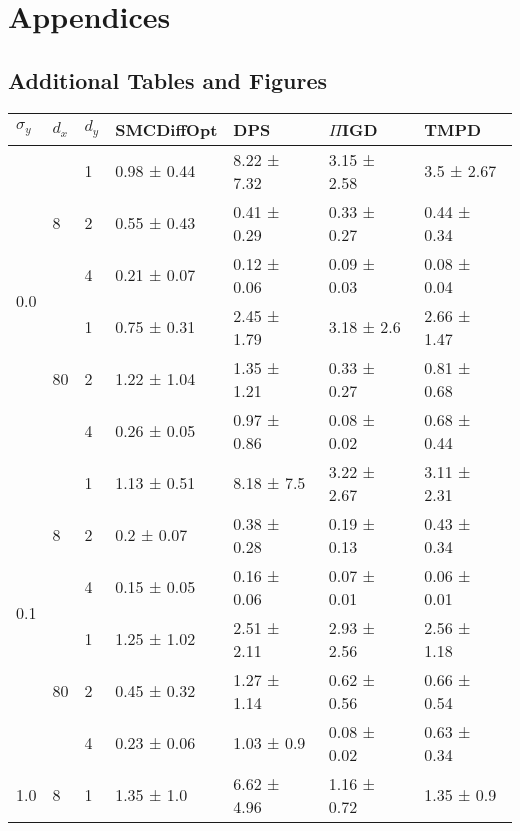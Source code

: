 \chapter*{Appendices}

\section{Additional Tables and Figures}\label{sec:tables}

\begin{table}[ht]
    \centering
    \begin{tabular}{lllllll}
        \toprule
        $\sigma_y$ & $d_x$ & $d_y$ & SMCDiffOpt & DPS & $\Pi$IGD & TMPD \\
        \midrule
        \multirow[t]{6}{*}{0.0} & \multirow[t]{3}{*}{8} & 1 & 0.98 ± 0.44 & 8.22 ± 7.32 & 3.15 ± 2.58 & 3.5 ± 2.67 \\
         &  & 2 & 0.55 ± 0.43 & 0.41 ± 0.29 & 0.33 ± 0.27 & 0.44 ± 0.34 \\
         &  & 4 & 0.21 ± 0.07 & 0.12 ± 0.06 & 0.09 ± 0.03 & 0.08 ± 0.04 \\
        \cline{2-7}
         & \multirow[t]{3}{*}{80} & 1 & 0.75 ± 0.31 & 2.45 ± 1.79 & 3.18 ± 2.6 & 2.66 ± 1.47 \\
         &  & 2 & 1.22 ± 1.04 & 1.35 ± 1.21 & 0.33 ± 0.27 & 0.81 ± 0.68 \\
         &  & 4 & 0.26 ± 0.05 & 0.97 ± 0.86 & 0.08 ± 0.02 & 0.68 ± 0.44 \\
        \cline{1-7} \cline{2-7}
        \multirow[t]{6}{*}{0.1} & \multirow[t]{3}{*}{8} & 1 & 1.13 ± 0.51 & 8.18 ± 7.5 & 3.22 ± 2.67 & 3.11 ± 2.31 \\
         &  & 2 & 0.2 ± 0.07 & 0.38 ± 0.28 & 0.19 ± 0.13 & 0.43 ± 0.34 \\
         &  & 4 & 0.15 ± 0.05 & 0.16 ± 0.06 & 0.07 ± 0.01 & 0.06 ± 0.01 \\
        \cline{2-7}
         & \multirow[t]{3}{*}{80} & 1 & 1.25 ± 1.02 & 2.51 ± 2.11 & 2.93 ± 2.56 & 2.56 ± 1.18 \\
         &  & 2 & 0.45 ± 0.32 & 1.27 ± 1.14 & 0.62 ± 0.56 & 0.66 ± 0.54 \\
         &  & 4 & 0.23 ± 0.06 & 1.03 ± 0.9 & 0.08 ± 0.02 & 0.63 ± 0.34 \\
        \cline{1-7} \cline{2-7}
        \multirow[t]{6}{*}{1.0} & \multirow[t]{3}{*}{8} & 1 & 1.35 ± 1.0 & 6.62 ± 4.96 & 1.16 ± 0.72 & 1.35 ± 0.9 \\

\end{tabular}
\end{table}
